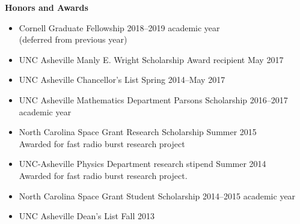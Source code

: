 \documentclass[a4paper, 11pt]{article}
\newcommand{\noi}{\noindent}
\begin{document}
\noi \textbf{Honors and Awards}
\begin{itemize}[leftmargin=*]
	\item Cornell Graduate Fellowship \hfill 2018--2019 academic year
	\\
	\null \hfill (deferred from previous year)
	\\

	\item UNC Asheville Manly E. Wright Scholarship Award recipient \hfill May 2017
	\\

	\item UNC Asheville Chancellor's List \hfill Spring 2014--May 2017

	\item UNC Asheville Mathematics Department Parsons Scholarship \hfill 2016--2017 academic year
	\\

	\item North Carolina Space Grant Research Scholarship \hfill Summer 2015 
	\\
	Awarded for fast radio burst research project
	\\

	\item UNC-Asheville Physics Department research stipend \hfill Summer 2014
	\\
	Awarded for fast radio burst research project.
	\\

	\item North Carolina Space Grant Student Scholarship \hfill 2014--2015 academic year
	\\

	\item UNC Asheville Dean's List \hfill Fall 2013

\end{itemize}
\end{document}
